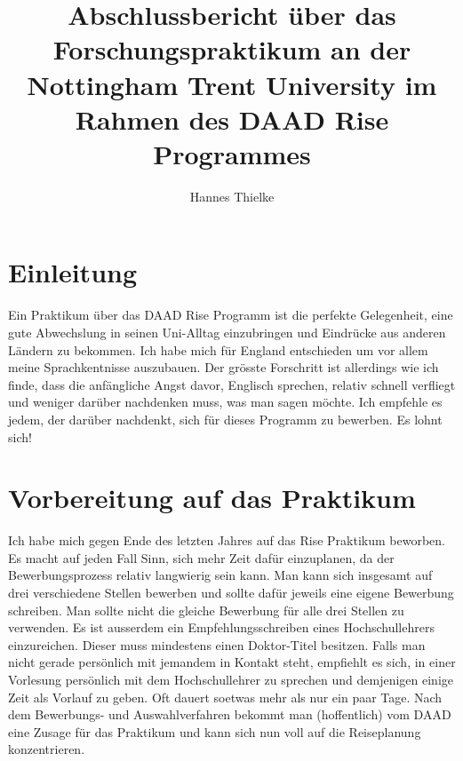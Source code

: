 \documentclass{article}
\title{Abschlussbericht \"uber das Forschungspraktikum an der Nottingham Trent University im Rahmen des DAAD Rise Programmes}
\author{Hannes Thielke}
\begin{document}
\maketitle         %


\newpage                %

\section{Einleitung}
Ein Praktikum \"uber das DAAD Rise Programm ist die perfekte Gelegenheit, eine gute Abwechslung in seinen Uni-Alltag einzubringen und Eindr\"ucke aus anderen L\"andern zu bekommen. 
Ich habe mich f\"ur England entschieden um vor allem meine Sprachkentnisse auszubauen. Der gr\"osste Forschritt ist allerdings wie ich finde, dass die anf\"angliche Angst davor, Englisch sprechen, relativ schnell verfliegt und weniger dar\"uber nachdenken muss, was man sagen m\"ochte.
Ich empfehle es jedem, der dar\"uber nachdenkt, sich f\"ur dieses Programm zu bewerben. Es lohnt sich!

\section{Vorbereitung auf das Praktikum}
Ich habe mich gegen Ende des letzten Jahres auf das Rise Praktikum beworben.  Es macht auf jeden Fall Sinn, sich mehr Zeit daf\"ur einzuplanen, da der Bewerbungsprozess relativ langwierig sein kann. Man kann sich insgesamt auf drei verschiedene Stellen bewerben und sollte daf\"ur jeweils eine eigene Bewerbung schreiben. Man sollte nicht die gleiche Bewerbung f\"ur alle drei Stellen zu verwenden.
Es ist ausserdem ein Empfehlungsschreiben eines Hochschullehrers einzureichen. Dieser muss mindestens einen Doktor-Titel besitzen. Falls man nicht gerade pers\"onlich mit jemandem in Kontakt steht, empfiehlt es sich, in einer Vorlesung pers\"onlich mit dem Hochschullehrer zu sprechen und demjenigen einige Zeit als Vorlauf zu geben. Oft dauert soetwas mehr als nur ein paar Tage.
Nach dem Bewerbungs- und Auswahlverfahren bekommt man (hoffentlich) vom DAAD eine Zusage f\"ur das Praktikum und kann sich nun voll auf die Reiseplanung konzentrieren.
\end{document}
